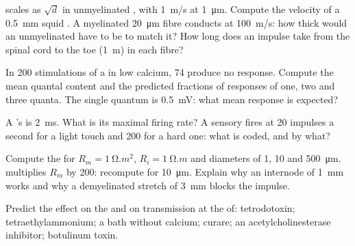 \begin{exercise}[$\star\star$]\label{exo:b2:neurons-synapses:7}
 scales as $\sqrt d$ in unmyelinated , with
\qty{1}{m/s} at \qty{1}{\micro m}. Compute the velocity of a
\qty{0.5}{mm} squid . A myelinated \qty{20}{\micro m} fibre
conducts at \qty{100}{m/s}: how thick would an unmyelinated  have
to be to match it? How long does an impulse take from the spinal
cord to the toe (\qty{1}{m}) in each fibre?
\end{exercise}

\begin{exercise}[$\star\star$]\label{exo:b2:neurons-synapses:8}
In 200 stimulations of a  in low calcium, 74 produce no
response. Compute the mean quantal content and the predicted
fractions of responses of one, two and three quanta. The single
quantum is \qty{0.5}{mV}: what mean response is expected?
\end{exercise}

\begin{exercise}[$\star\star$]\label{exo:b2:neurons-synapses:9}
A 's  is \qty{2}{ms}. What is its maximal
firing rate? A sensory  fires at 20 impulses a second for a
light touch and 200 for a hard one: what is coded, and by what?
\end{exercise}

\begin{exercise}[$\star\star\star$]\label{exo:b2:neurons-synapses:10}
Compute the  for $R_m = \qty{1}{\ohm.m^2}$, $R_i =
\qty{1}{\ohm.m}$ and diameters of 1, 10 and \qty{500}{\micro m}. 
multiplies $R_m$ by 200: recompute for \qty{10}{\micro m}. Explain
why an internode of \qty{1}{mm} works and why a demyelinated stretch
of \qty{3}{mm} blocks the impulse.
\end{exercise}

\begin{exercise}[$\star\star\star$]\label{exo:b2:neurons-synapses:11}
Predict the effect on the  and on transmission at
the  of: tetrodotoxin; tetraethylammonium; a
bath without calcium; curare; an acetylcholinesterase inhibitor;
botulinum toxin.
\end{exercise}

